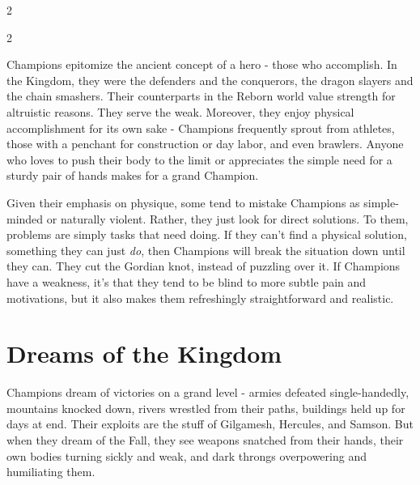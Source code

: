 \begin{multicols}{2}
\begin{mybox}
\end{mybox}

\end{multicols}\newpage{}
\label{scha:Champion}\begin{multicols}{2}\raggedcolumns

\noindent Champions epitomize the ancient concept of a hero - those who accomplish. In the Kingdom, they were the defenders and the conquerors, the dragon slayers and the chain smashers. Their counterparts in the Reborn world value strength for altruistic reasons. They serve the weak. Moreover, they enjoy physical accomplishment for its own sake - Champions frequently sprout from athletes, those with a penchant for construction or day labor, and even brawlers. Anyone who loves to push their body to the limit or appreciates the simple need for a sturdy pair of hands makes for a grand Champion.

Given their emphasis on physique, some tend to mistake Champions as simple-minded or naturally violent. Rather, they just look for direct solutions. To them, problems are simply tasks that need doing. If they can't find a physical solution, something they can just \textit{do}, then Champions will break the situation down until they can. They cut the Gordian knot, instead of puzzling over it. If Champions have a weakness, it's that they tend to be blind to more subtle pain and motivations, but it also makes them refreshingly straightforward and realistic. 

\section*{Dreams of the Kingdom}

Champions dream of victories on a grand level - armies defeated single-handedly, mountains knocked down, rivers wrestled from their paths, buildings held up for days at end. Their exploits are the stuff of Gilgamesh, Hercules, and Samson. But when they dream of the Fall, they see weapons snatched from their hands, their own bodies turning sickly and weak, and dark throngs overpowering and humiliating them. 


\end{multicols}
